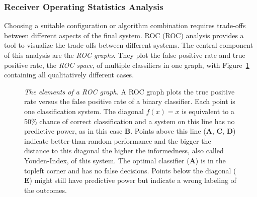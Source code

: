 \subsubsection{Receiver Operating Statistics Analysis}

Choosing a suitable configuration or algorithm combination requires trade-offs between different aspects of the final system.
\acrlong{ROC} (\acrshort{ROC}) analysis\cite{fawcett_2006} provides a tool to visualize the trade-offs between different systems.
The central component of this analysis are the \emph{\acrshort{ROC} graphs}.
They plot the false positive rate and true positive rate, the \emph{\acrshort{ROC} space}, of multiple classifiers in one graph, with Figure~\ref{fig:roc_graph} containing all qualitatively different cases.
\begin{figure}[H]
\caption[The elements of a \acrshort{ROC} graph]{\emph{The elements of a \acrshort{ROC} graph.} A \acrshort{ROC} graph plots the true positive rate versus the false positive rate of a binary classifier. Each point is one classification system. The diagonal $f(x) = x$ is equivalent to a 50\% chance of correct classification and a system on this line has no predictive power, as in this case $\mathbf{B}$. Points above this line ($\mathbf{A}$, $\mathbf{C}$, $\mathbf{D}$) indicate better-than-random performance and the bigger the distance to this diagonal the higher the informedness, also called Youden-Index, of this system. The optimal classifier ($\mathbf{A}$) is in the topleft corner and has no false decisions. Points below the diagonal ($\mathbf{E}$) might still have predictive power but indicate a wrong labeling of the outcomes.}\label{fig:roc_graph}
\end{figure}

